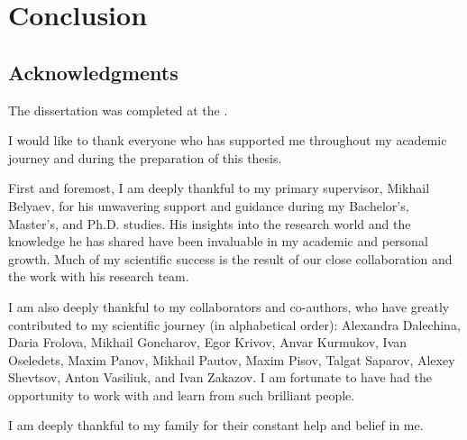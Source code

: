 \chapter*{Conclusion}



\section*{Acknowledgments}
The dissertation was completed at the {\thesisOrganizationEnNonTitle}.

I would like to thank everyone who has supported me throughout my academic journey and during the preparation of this thesis.

First and foremost, I am deeply thankful to my primary supervisor, Mikhail Belyaev, for his unwavering support and guidance during my Bachelor's, Master's, and Ph.D. studies. His insights into the research world and the knowledge he has shared have been invaluable in my academic and personal growth. Much of my scientific success is the result of our close collaboration and the work with his research team.

I am also deeply thankful to my collaborators and co-authors, who have greatly contributed to my scientific journey (in alphabetical order): Alexandra Dalechina, Daria Frolova, Mikhail Goncharov, Egor Krivov, Anvar Kurmukov, Ivan Oseledets, Maxim Panov, Mikhail Pautov, Maxim Pisov, Talgat Saparov, Alexey Shevtsov, Anton Vasiliuk, and Ivan Zakazov. I am fortunate to have had the opportunity to work with and learn from such brilliant people.

I am deeply thankful to my family for their constant help and belief in me.



